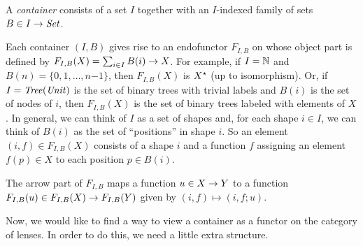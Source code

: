 \begin{defn}[$R$-similarity]
\begin{theorem}
\begin{lemma}
\begin{theorem}[No products]
\begin{lemma}
\begin{defn}
\begin{theorem}
\begin{corollary}[Hylomorphism]
\begin{defn}[Container]
A {\em container} consists of a set $I$ together with an $I$-indexed family
of sets $B \in I \rightarrow \mathit{Set}$.  
\end{defn}

Each container $(I,B)$ gives rise to an endofunctor $F_{I,B}$ on
\SET{} whose object part is defined by $F_{I,B}(X) = \sum_{i\in I}
B(i)\rightarrow X$.  For example, if $I = \mathbb{N}$ and $B(n) =
\{0,1,\ldots,n\mathord{-}1\}$, then $F_{I,B}(X)$ is
$X^\star$ (up to isomorphism).  Or, if $I = \mathit{Tree}(\mathit{Unit})$ is the set of binary trees with
trivial labels and $B(i)$ is the set of nodes of $i$, then $F_{I,B}(X)$ is
the set of binary trees labeled with elements of $X$.
%
In general, we can think of $I$ as a
set of shapes and, for each shape $i\in I$, we can think of $B(i)$ as the
set of ``positions'' in shape $i$. So an element $(i,f) \in F_{I,B}(X)$
consists of a shape $i$ and a function $f$ assigning an element $f(p)\in X$
to each position $p\in B(i)$.
\iffull

\fi
The arrow part of $F_{I,B}$ maps a function $u\in X\rightarrow Y$ 
to a function $F_{I,B}(u) \in F_{I,B}(X) \rightarrow F_{I,B}(Y)$ given by $(i,f)
\mapsto (i,f;u)$. 

Now, we would like to find a way to view a container as a functor on the
category of lenses.  In order to do this, we need a little extra structure.


\end{corollary}
\end{theorem}
\end{defn}
\end{lemma}
\end{theorem}
\end{lemma}
\end{theorem}
\end{defn}
